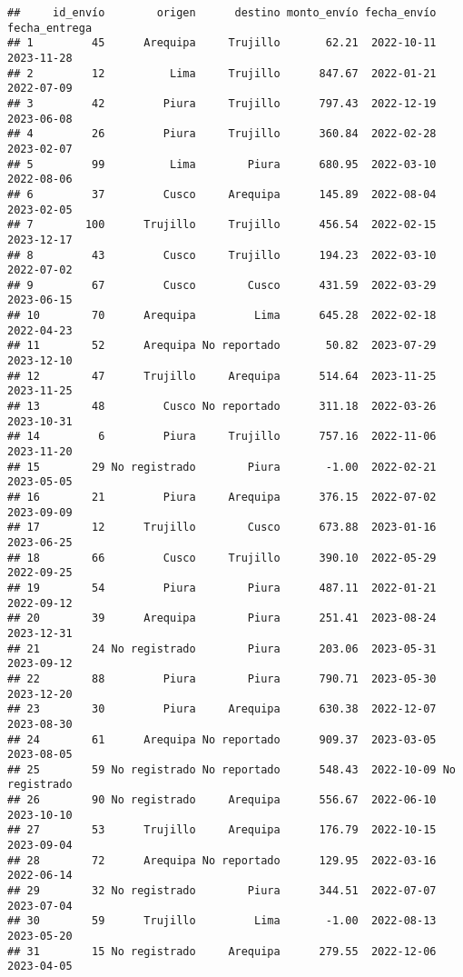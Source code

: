 \documentclass[
]{article}
\begin{document}
\begin{verbatim}
##     id_envío        origen      destino monto_envío fecha_envío fecha_entrega
## 1         45      Arequipa     Trujillo       62.21  2022-10-11    2023-11-28
## 2         12          Lima     Trujillo      847.67  2022-01-21    2022-07-09
## 3         42         Piura     Trujillo      797.43  2022-12-19    2023-06-08
## 4         26         Piura     Trujillo      360.84  2022-02-28    2023-02-07
## 5         99          Lima        Piura      680.95  2022-03-10    2022-08-06
## 6         37         Cusco     Arequipa      145.89  2022-08-04    2023-02-05
## 7        100      Trujillo     Trujillo      456.54  2022-02-15    2023-12-17
## 8         43         Cusco     Trujillo      194.23  2022-03-10    2022-07-02
## 9         67         Cusco        Cusco      431.59  2022-03-29    2023-06-15
## 10        70      Arequipa         Lima      645.28  2022-02-18    2022-04-23
## 11        52      Arequipa No reportado       50.82  2023-07-29    2023-12-10
## 12        47      Trujillo     Arequipa      514.64  2023-11-25    2023-11-25
## 13        48         Cusco No reportado      311.18  2022-03-26    2023-10-31
## 14         6         Piura     Trujillo      757.16  2022-11-06    2023-11-20
## 15        29 No registrado        Piura       -1.00  2022-02-21    2023-05-05
## 16        21         Piura     Arequipa      376.15  2022-07-02    2023-09-09
## 17        12      Trujillo        Cusco      673.88  2023-01-16    2023-06-25
## 18        66         Cusco     Trujillo      390.10  2022-05-29    2022-09-25
## 19        54         Piura        Piura      487.11  2022-01-21    2022-09-12
## 20        39      Arequipa        Piura      251.41  2023-08-24    2023-12-31
## 21        24 No registrado        Piura      203.06  2023-05-31    2023-09-12
## 22        88         Piura        Piura      790.71  2023-05-30    2023-12-20
## 23        30         Piura     Arequipa      630.38  2022-12-07    2023-08-30
## 24        61      Arequipa No reportado      909.37  2023-03-05    2023-08-05
## 25        59 No registrado No reportado      548.43  2022-10-09 No registrado
## 26        90 No registrado     Arequipa      556.67  2022-06-10    2023-10-10
## 27        53      Trujillo     Arequipa      176.79  2022-10-15    2023-09-04
## 28        72      Arequipa No reportado      129.95  2022-03-16    2022-06-14
## 29        32 No registrado        Piura      344.51  2022-07-07    2023-07-04
## 30        59      Trujillo         Lima       -1.00  2022-08-13    2023-05-20
## 31        15 No registrado     Arequipa      279.55  2022-12-06    2023-04-05

\end{verbatim}
\end{document}
